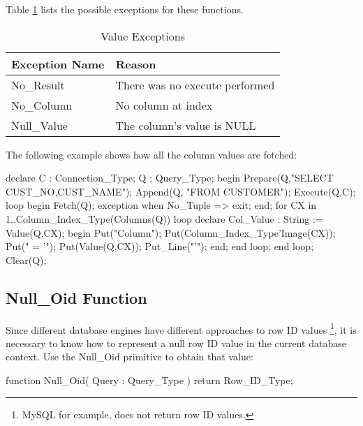 \documentclass[english,letterpaper]{book}
\begin{document}
Table \ref{t:valx} lists the possible exceptions for these functions.

\begin{table}
   \begin{center}
      \begin{tabular}{ll}
         Exception Name    &  Reason\\
         \hline 
         No\_Result        &  There was no execute performed\\
         No\_Column        &  No column at index\\
         Null\_Value       &  The column's value is NULL\\
      \end{tabular}
   \end{center}
   \caption{Value Exceptions}\label{t:valx}
\end{table}

The following example shows how all the column values are fetched:

\begin{Example}
   declare
     C : Connection_Type;
     Q : Query_Type;
   begin
     Prepare(Q,"SELECT CUST_NO,CUST_NAME");
     Append(Q, "FROM CUSTOMER");
     Execute(Q,C);
     loop
        begin
           Fetch(Q);
        exception
           when No_Tuple =>
              exit;
        end;
        for CX in 1..Column_Index_Type(Columns(Q)) loop
           declare
               Col_Value : String := Value(Q,CX);
           begin
               Put("Column");
               Put(Column_Index_Type'Image(CX));
               Put(" = '");
               Put(Value(Q,CX));
               Put_Line("'");
           end;
        end loop;
     end loop;
     Clear(Q);
\end{Example}

\subsection{Null\_Oid Function\label{Null_Oid Function}}

Since different database engines have different approaches to row
ID values%
\footnote{MySQL for example, does not return row ID values.%
}, it is necessary to know how to represent a null row ID value in
the current database context. Use the Null\_Oid primitive
to obtain that value:

\begin{Code}
function Null_Oid(
   Query : Query_Type
) return Row_ID_Type;
\end{Code}
\end{document}
